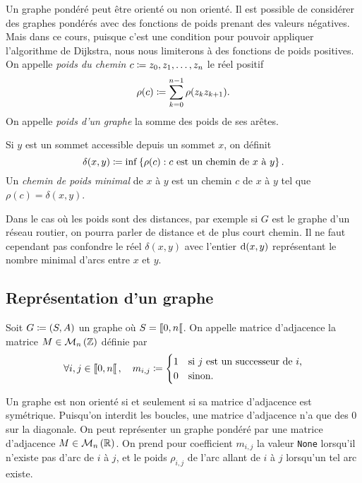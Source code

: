 \documentclass{magnolia}
\begin{document}
\begin{remarques}
\remarque Un graphe pondéré peut être orienté ou non orienté.
\remarque Il est possible de considérer des graphes pondérés avec des fonctions de poids
  prenant des valeurs négatives. Mais dans ce cours, puisque c'est une condition pour
  pouvoir
  appliquer l'algorithme de Dijkstra, nous nous limiterons à des fonctions de poids
  positives.
\remarque On appelle \emph{poids du chemin} $c\coloneqq z_0,z_1,\ldots,z_n$ le réel
  positif
  \[\rho(c)\coloneqq \sum_{k=0}^{n-1} \rho(z_k z_{k+1}).\]
\remarque On appelle \emph{poids d'un graphe} la somme des poids de ses arêtes.
\end{remarques}

\begin{definition}
  Si $y$ est un sommet accessible depuis un sommet $x$, on définit
  \[\delta(x, y) \coloneqq \inf \left\{\rho(c) : c
        \textnormal{ est un chemin de } x \textnormal{ à } y\right\}.\]
  Un \emph{chemin de poids minimal} de $x$ à $y$ est un chemin $c$
  de $x$ à $y$ tel que $\rho(c) = \delta(x, y)$.
\end{definition}

\begin{remarqueUnique}
\remarque Dans le cas où les poids sont des distances, par exemple
  si $G$ est le graphe d'un réseau routier, on pourra parler de distance et de plus court
  chemin. Il ne faut cependant pas confondre le réel $\delta(x,y)$ avec l'entier
  ${\rm d}(x,y)$ représentant le nombre minimal d'arcs entre $x$ et $y$.
\end{remarqueUnique}
  
\subsection{Représentation d'un graphe}


\begin{definition}
Soit $G\coloneqq\left(S,A\right)$ un graphe où $S=\left\llbracket 0,n\right\llbracket$. On appelle matrice d'adjacence la matrice $M\in\mathcal{M}_{n}\left(\mathbb{Z}\right)$ définie par
\[\forall i,j\in\left\llbracket 0,n\right\llbracket ,\quad m_{i,j}\coloneqq\begin{cases}
  1 & \text{si $j$ est un successeur de  $i$,}\\
  0 & \text{sinon.}
\end{cases}\]
\end{definition}

\begin{remarques}
\remarque Un graphe est \og non orienté \fg si et seulement si sa matrice d'adjacence est symétrique.
\remarque Puisqu'on interdit les boucles, une matrice d'adjacence n'a
  que des 0 sur la diagonale.
\remarque On peut représenter un graphe pondéré par une matrice d'adjacence $M\in\mathcal{M}_{n}\left(\mathbb{R}\right)$. On prend
    pour coefficient $m_{i,j}$ la valeur \verb!None! lorsqu'il n'existe pas d'arc
    de $i$ à $j$, et le poids $\rho_{i,j}$ de l'arc allant de $i$ à $j$
    lorsqu'un tel arc existe. 
\end{remarques}
\end{document}
